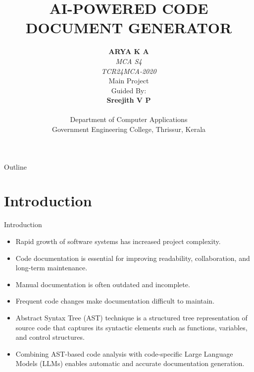 \documentclass{beamer}
\title{AI-POWERED CODE DOCUMENT GENERATOR}
\author{\textbf{ARYA K A} \\ \textit{MCA S4\\ TCR24MCA-2020\\} \vspace{0.6cm}     
    Main Project  \\ 
 \vspace{13mm}     
    Guided By: \\
 \textbf{Sreejith V P} \\
    \\
    \vspace{0.3cm}
    Department of Computer Applications\\
    Government Engineering College, Thrissur, Kerala
}
\date[GEC Thrissur]{}
\begin{document}
\begin{frame}[plain]
  \titlepage
  
\end{frame}


\begin{frame}[allowframebreaks]{Outline}
\setlength{\parskip}{1pt}   %
\setlength{\itemsep}{2pt}   %

\tableofcontents[
    sectionstyle=show/show,     %
    subsectionstyle=hide,       %
    subsubsectionstyle=hide
]
\end{frame}



\section{Introduction}

\begin{frame}{Introduction}

\begin{itemize}
  \justifying
  \item Rapid growth of software systems has increased project complexity.

\item Code documentation is essential for improving readability, collaboration, and long-term maintenance.

\item Manual documentation is often outdated and incomplete.

\item Frequent code changes make documentation difficult to maintain.

\item Abstract Syntax Tree (AST) technique is a structured tree representation of source code that captures its syntactic elements such as functions, variables, and control structures.

\item Combining AST-based code analysis with code-specific Large Language Models (LLMs) enables automatic and accurate documentation generation.

  
\end{itemize}

\end{frame}
\end{document}
